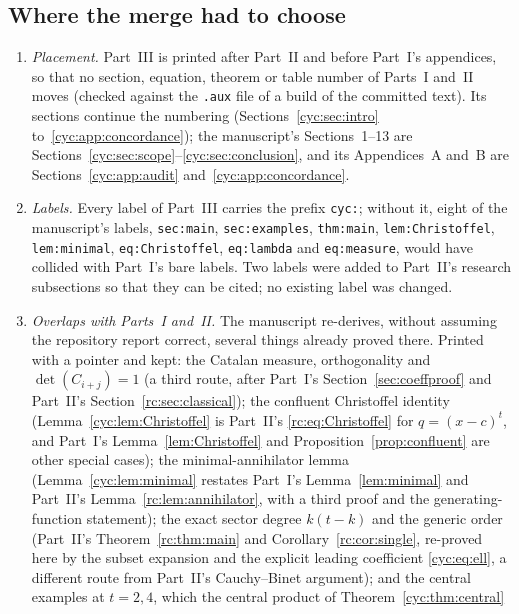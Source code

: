 \documentclass[11pt,a4paper]{article}
\numberwithin{equation}{section}
\theoremstyle{definition}
\theoremstyle{remark}
\begin{document}
\subsection{Where the merge had to choose}\label{cyc:sec:merge}
\begin{enumerate}[leftmargin=*,itemsep=2pt]
\item \emph{Placement.}  Part~III is printed after Part~II and before
 Part~I's appendices, so that no section, equation, theorem or table
 number of Parts~I and~II moves (checked against the \texttt{.aux} file of
 a build of the committed text).  Its sections continue the numbering
 (Sections~\ref{cyc:sec:intro} to~\ref{cyc:app:concordance}); the
 manuscript's Sections~1--13 are
 Sections~\ref{cyc:sec:scope}--\ref{cyc:sec:conclusion}, and its
 Appendices~A and~B are Sections~\ref{cyc:app:audit}
 and~\ref{cyc:app:concordance}.
\item \emph{Labels.}  Every label of Part~III carries the prefix
 \texttt{cyc:}; without it, eight of the manuscript's labels,
 \texttt{sec:main}, \texttt{sec:examples}, \texttt{thm:main},
 \texttt{lem:Christoffel}, \texttt{lem:minimal}, \texttt{eq:Christoffel},
 \texttt{eq:lambda} and \texttt{eq:measure}, would have collided with
 Part~I's bare labels.  Two labels were added to Part~II's research subsections so that
 they can be cited; no existing label was changed.
\item \emph{Overlaps with Parts~I and~II.}  The manuscript re-derives,
 without assuming the repository report correct, several things already
 proved there.  Printed with a pointer and kept: the Catalan measure,
 orthogonality and $\det(C_{i+j})=1$ (a third route, after Part~I's
 Section~\ref{sec:coeffproof} and Part~II's Section~\ref{rc:sec:classical});
 the confluent Christoffel identity (Lemma~\ref{cyc:lem:Christoffel} is
 Part~II's \eqref{rc:eq:Christoffel} for $q=(x-c)^t$, and Part~I's
 Lemma~\ref{lem:Christoffel} and Proposition~\ref{prop:confluent} are
 other special cases); the minimal-annihilator lemma
 (Lemma~\ref{cyc:lem:minimal} restates Part~I's Lemma~\ref{lem:minimal} and
 Part~II's Lemma~\ref{rc:lem:annihilator}, with a third proof and the
 generating-function statement); the exact sector degree $k(t-k)$ and the
 generic order (Part~II's Theorem~\ref{rc:thm:main} and
 Corollary~\ref{rc:cor:single}, re-proved here by the subset expansion and
 the explicit leading coefficient \eqref{cyc:eq:ell}, a different route
 from Part~II's Cauchy--Binet argument); and the central examples at
 $t=2,4$, which the central product of Theorem~\ref{cyc:thm:central}

\end{enumerate}
\end{document}
